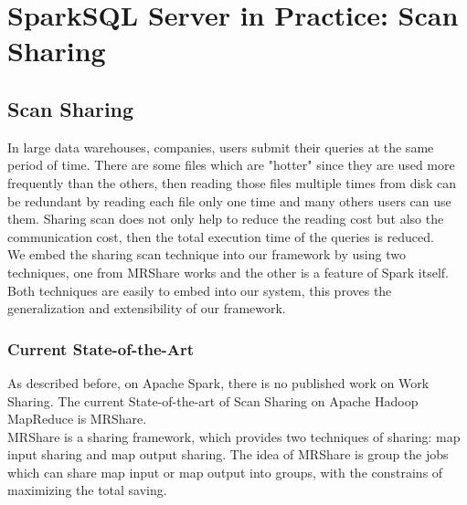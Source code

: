 
\chapter{SparkSQL Server in Practice: Scan Sharing} %

\label{Chapter4} %



\section{Scan Sharing}

In large data warehouses, companies, users submit their queries at the same period of time. There are some files which are "hotter" since they are used more frequently than the others, then reading those files multiple times from disk can be redundant by reading each file only one time and many others users can use them. Sharing scan does not only help to reduce the reading cost but also the communication cost, then the total execution time of the queries is reduced.\\

We embed the sharing scan technique into our framework by using two techniques, one from MRShare works and the other is a feature of Spark itself. Both techniques are easily to embed into our system, this proves the generalization and extensibility of our framework.

\subsection{Current State-of-the-Art}

As described before,  on Apache Spark, there is no published work on Work Sharing. The current State-of-the-art of Scan Sharing on Apache Hadoop MapReduce is MRShare.\\
MRShare is a sharing framework, which provides two techniques of sharing: map input sharing and map output sharing. The idea of MRShare is group the jobs which can share map input or map output into groups, with the constrains of maximizing the total saving.\\

